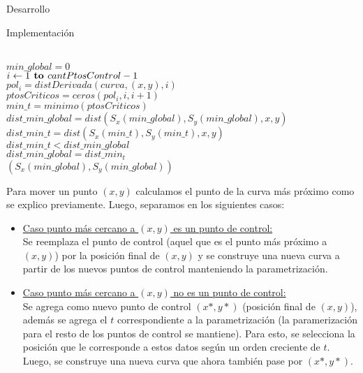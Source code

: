 \begin{section}{Desarrollo}
\begin{subsection}{Implementación}
\begin{itemize}
				\begin{pseudo}
					\\
					\tab $min\_global = 0$\\
					\tab \FOR $i\gets 1 \textbf{ to } cantPtosControl-1$\\
					\tab\tab $pol_i = distDerivada(curva,(x,y),i)$\\
					\tab\tab $ptosCriticos = ceros(pol_i,i,i+1)$\\
					\tab\tab $min\_t = minimo(ptosCriticos)$\\
					\tab\tab $dist\_min\_global = dist(S_x(min\_global),S_y(min\_global),x,y)$\\
					\tab\tab $dist\_min\_t = dist(S_x(min\_t),S_y(min\_t),x,y)$\\
					\tab\tab \IF $dist\_min\_t < dist\_min\_global$ \THEN\\
					\tab\tab\tab $dist\_min\_global = dist\_min_t$\\
					\tab \RET $(S_x(min\_global),S_y(min\_global))$\\
				\end{pseudo}
				
				Para mover un punto $(x,y)$	calculamos el punto de la curva más próximo como se explico previamente. Luego, separamos en los siguientes casos:
				
				\begin{itemize}
					\item \underline{Caso punto más cercano a $(x,y)$ es un punto de control:}\\
					
						Se reemplaza el punto de control (aquel que es el punto más próximo a $(x,y)$) por la posición final de $(x,y)$ y se construye una nueva curva a partir de los nuevos puntos de control manteniendo la parametrización.\\
					
					\item \underline{Caso punto más cercano a $(x,y)$ no es un punto de control:}\\
					
						Se agrega como nuevo punto de control $(x*,y*)$ (posición final de $(x,y)$), además se agrega el $t$ correspondiente a la parametrización (la paramerización para el resto de los puntos de control se mantiene).
						Para esto, se selecciona la posición que le corresponde a estos datos según un orden creciente de $t$. Luego, se construye una nueva curva que ahora también pase por $(x*,y*)$.
				\end{itemize}
				

\end{itemize}
\end{subsection}
\end{section}
